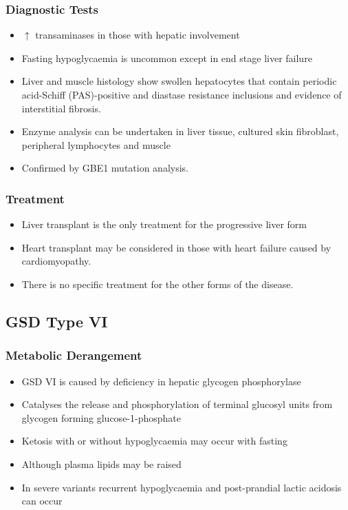 \documentclass{scrartcl}
\begin{document}
\subsubsection{Diagnostic Tests}
\label{sec:org69a6374}

\begin{itemize}
\item \(\uparrow\) transaminases in those with hepatic involvement
\item Fasting hypoglycaemia is uncommon except in end stage liver failure
\item Liver and muscle histology show swollen hepatocytes that contain
periodic acid-Schiff (PAS)-positive and diastase resistance
inclusions and evidence of interstitial fibrosis.
\item Enzyme analysis can be undertaken in liver tissue, cultured skin
fibroblast, peripheral lymphocytes and muscle
\item Confirmed by GBE1 mutation analysis.
\end{itemize}

\subsubsection{Treatment}
\label{sec:orgca6d0f9}
\begin{itemize}
\item Liver transplant is the only treatment for the progressive liver form
\item Heart transplant may be considered in those with heart failure caused by cardiomyopathy.
\item There is no specific treatment for the other forms of the disease.
\end{itemize}
\subsection{GSD Type VI}
\label{sec:orga77e4a8}
\subsubsection{Metabolic Derangement}
\label{sec:org77bdb78}
\begin{itemize}
\item GSD VI is caused by deficiency in hepatic glycogen phosphorylase
\item Catalyses the release and phosphorylation of terminal glucosyl units
from glycogen forming glucose-1-phosphate
\item Ketosis with or without hypoglycaemia may occur with fasting
\item Although plasma lipids may be raised
\item In severe variants recurrent hypoglycaemia and post-prandial lactic
acidosis can occur
\end{itemize}
\end{document}
